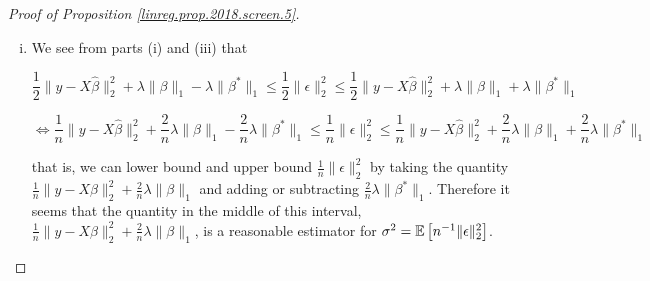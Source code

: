 \begin{proof}[Proof of Proposition \ref{linreg.prop.2018.screen.5}]
\begin{enumerate}[(a)]
\begin{enumerate}[(i)]
By H\"{o}lder's Inequality, we have for any two vectors \(u, v \in \mathbb{R}^n\), \( | u^Tv | \leq \lVert u \rVert_\infty \lVert v \rVert_1\). Therefore

\[
| \epsilon^T X \beta^*| = | (X^T \epsilon)^T \beta^* | \leq \lVert X^T \epsilon \rVert_\infty \lVert \beta^* \rVert_1 \leq \lambda \lVert \beta^* \rVert_1
\]

where the last step used the assumption \(\lVert X^T \epsilon \rVert_\infty \leq \lambda\). So we have 

\[
 \frac{1}{2} \lVert \epsilon \rVert_2^2 +\lambda \lVert \beta^* \rVert_1 \leq \frac{1}{2} \lVert \epsilon \rVert_2^2 + \epsilon^T X \beta^* .
\]

Substituting in to (\ref{2018.screen.5.c.ii.result}), using the identity in (\ref{2018.screen.5.c.ii.result.rewritten}), and using the result from part 5(c)(iii) yields

\[
 \frac{1}{2} \lVert \epsilon \rVert_2^2 +\lambda \lVert \beta^* \rVert_1 \leq \frac{1}{2} \lVert \epsilon \rVert_2^2 + \epsilon^T X \beta^* = \frac{1}{2} \lVert y \rVert_2^2 - \frac{1}{2} \lVert X \beta^* \rVert_2^2  \leq \frac{1}{2} \lVert y - X \hat{\beta} \rVert_2^2 + \lambda \lVert \beta \rVert_1 
\]

as desired.

\item  We see from parts (i) and (iii) that

\[
\frac{1}{2} \lVert y - X \hat{\beta} \rVert_2^2 + \lambda \lVert \beta \rVert_1 - \lambda \lVert \beta^* \rVert_1  \leq \frac{1}{2} \lVert \epsilon \rVert_2^2 \leq  \frac{1}{2} \lVert y - X \hat{\beta} \rVert_2^2 + \lambda \lVert \beta \rVert_1 + \lambda \lVert \beta^* \rVert_1 
\]

\[
\iff \frac{1}{n} \lVert y - X \hat{\beta} \rVert_2^2 + \frac{2}{n} \lambda \lVert \beta \rVert_1 - \frac{2}{n}\lambda \lVert \beta^* \rVert_1  \leq \frac{1}{n} \lVert \epsilon \rVert_2^2 \leq  \frac{1}{n} \lVert y - X \hat{\beta} \rVert_2^2 + \frac{2}{n}\lambda \lVert \beta \rVert_1 +\frac{2}{n} \lambda \lVert \beta^* \rVert_1 
\]

that is, we can lower bound and upper bound \(\frac{1}{n} \lVert \epsilon \rVert_2^2 \) by taking the quantity \(\frac{1}{n} \lVert y - X \hat{\beta} \rVert_2^2 + \frac{2}{n} \lambda \lVert \beta \rVert_1\) and adding or subtracting \(\frac{2}{n}\lambda \lVert \beta^* \rVert_1\). Therefore it seems that the quantity in the middle of this interval,  \(\frac{1}{n} \lVert y - X \hat{\beta} \rVert_2^2 + \frac{2}{n} \lambda \lVert \beta \rVert_1\), is a reasonable estimator for \(\sigma^2 = \mathbb{E} \left[ n^{-1} \lVert \epsilon \rVert_2^2 \right]\).

\end{enumerate}

\end{enumerate}

\end{proof}




